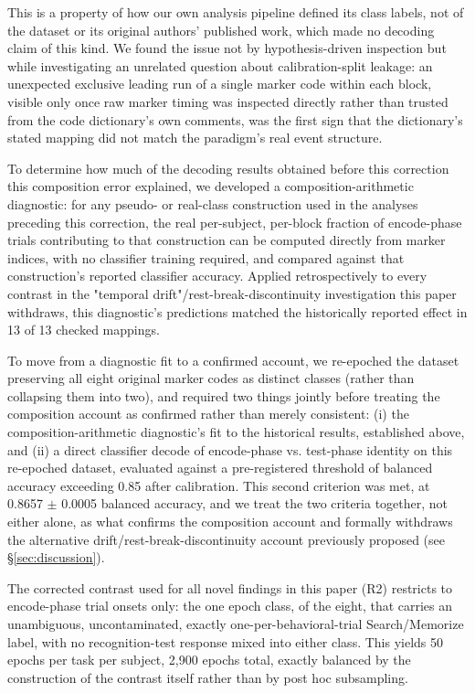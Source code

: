 \documentclass[preprint,12pt]{elsarticle}
\begin{document}
This is a property of how our own analysis pipeline defined its class labels, not of the dataset or its original authors' published work, which made no decoding claim of this kind. We found the issue not by hypothesis-driven inspection but while investigating an unrelated question about calibration-split leakage: an unexpected exclusive leading run of a single marker code within each block, visible only once raw marker timing was inspected directly rather than trusted from the code dictionary's own comments, was the first sign that the dictionary's stated mapping did not match the paradigm's real event structure.

To determine how much of the decoding results obtained before this correction this composition error explained, we developed a composition-arithmetic diagnostic: for any pseudo- or real-class construction used in the analyses preceding this correction, the real per-subject, per-block fraction of encode-phase trials contributing to that construction can be computed directly from marker indices, with no classifier training required, and compared against that construction's reported classifier accuracy. Applied retrospectively to every contrast in the "temporal drift"/rest-break-discontinuity investigation this paper withdraws, this diagnostic's predictions matched the historically reported effect in 13 of 13 checked mappings.

To move from a diagnostic fit to a confirmed account, we re-epoched the dataset preserving all eight original marker codes as distinct classes (rather than collapsing them into two), and required two things jointly before treating the composition account as confirmed rather than merely consistent: (i) the composition-arithmetic diagnostic's fit to the historical results, established above, and (ii) a direct classifier decode of encode-phase vs. test-phase identity on this re-epoched dataset, evaluated against a pre-registered threshold of balanced accuracy exceeding 0.85 after calibration. This second criterion was met, at 0.8657 $\pm$ 0.0005 balanced accuracy, and we treat the two criteria together, not either alone, as what confirms the composition account and formally withdraws the alternative drift/rest-break-discontinuity account previously proposed (see \S\ref{sec:discussion}).

The corrected contrast used for all novel findings in this paper (R2) restricts to encode-phase trial onsets only: the one epoch class, of the eight, that carries an unambiguous, uncontaminated, exactly one-per-behavioral-trial Search/Memorize label, with no recognition-test response mixed into either class. This yields 50 epochs per task per subject, 2,900 epochs total, exactly balanced by the construction of the contrast itself rather than by post hoc subsampling.
\end{document}
